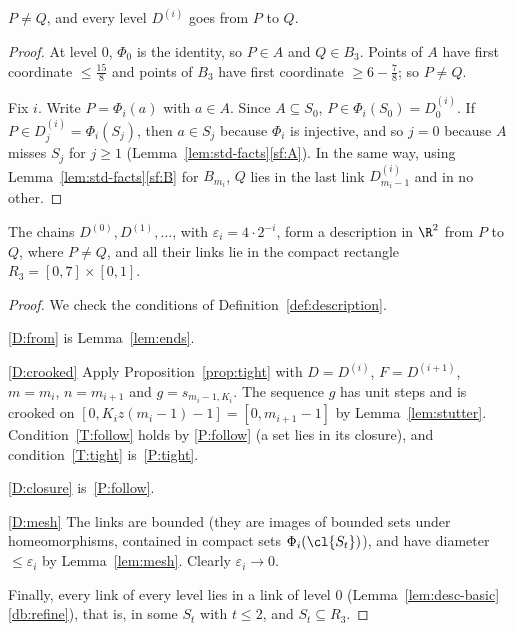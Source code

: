 \begin{lemma}\label{lem:ends}
$P\neq Q$, and every level $D^{(i)}$ goes from $P$ to $Q$.
\end{lemma}

\begin{proof}
At level $0$, $\Phi_0$ is the identity, so $P\in A$ and $Q\in B_3$. Points of $A$ have first
coordinate $\le\frac{15}8$ and points of $B_3$ have first coordinate $\ge6-\frac78$; so $P\neq Q$.

Fix $i$. Write $P=\Phi_i(a)$ with $a\in A$. Since $A\subseteq S_0$, $P\in\Phi_i(S_0)=D^{(i)}_0$. If
$P\in D^{(i)}_j=\Phi_i(S_j)$, then $a\in S_j$ because $\Phi_i$ is injective, and so $j=0$ because
$A$ misses $S_j$ for $j\ge1$ (Lemma~\ref{lem:std-facts}\ref{sf:A}). In the same way, using
Lemma~\ref{lem:std-facts}\ref{sf:B} for $B_{m_i}$, $Q$ lies in the last link $D^{(i)}_{m_i-1}$ and
in no other.
\end{proof}


\begin{theorem}\label{thm:plane-description}
The chains $D^{(0)},D^{(1)},\dots$, with $\varepsilon_i=4\cdot2^{-i}$, form a description in $\R^2$
from $P$ to $Q$, where $P\neq Q$, and all their links lie in the compact rectangle
$R_3=[0,7]\times[0,1]$.
\end{theorem}

\begin{proof}
We check the conditions of Definition~\ref{def:description}.

\ref{D:from} is Lemma~\ref{lem:ends}.

\ref{D:crooked} Apply Proposition~\ref{prop:tight} with $D=D^{(i)}$, $F=D^{(i+1)}$, $m=m_i$,
$n=m_{i+1}$ and $g=s_{m_i-1,K_i}$. The sequence $g$ has unit steps and is crooked on
$[0,K_iz(m_i-1)-1]=[0,m_{i+1}-1]$ by Lemma~\ref{lem:stutter}. Condition~\ref{T:follow} holds by
\ref{P:follow} (a set lies in its closure), and condition~\ref{T:tight} is~\ref{P:tight}.

\ref{D:closure} is~\ref{P:follow}.

\ref{D:mesh} The links are bounded (they are images of bounded sets under homeomorphisms, contained
in compact sets $\Phi_i(\cl{S_t})$), and have diameter $\le\varepsilon_i$ by Lemma~\ref{lem:mesh}.
Clearly $\varepsilon_i\to0$.

Finally, every link of every level lies in a link of level $0$ (Lemma~\ref{lem:desc-basic}
\ref{db:refine}), that is, in some $S_t$ with $t\le2$, and $S_t\subseteq R_3$.
\end{proof}

